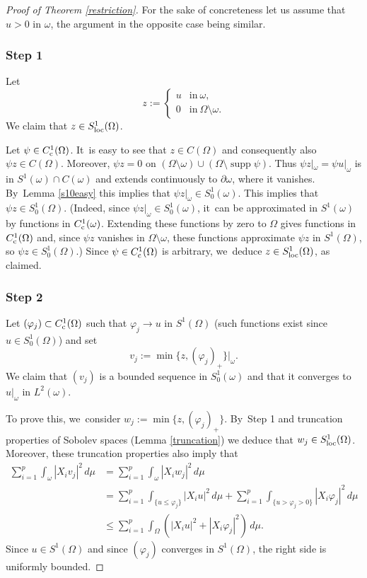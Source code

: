 \documentclass[10pt]{amsart}
\newcommand{\rc}{\textup{c}}
\newcommand{\loc}{\textup{loc}}
\theoremstyle{definition}
\let\phi\varphi
\newcommand{\1}{\mathbbm{1}}
\DeclareMathOperator{\supp}{supp}
\begin{document}
\begin{proof}[Proof of Theorem \ref{restriction}]
For the sake of concreteness let us assume that $u> 0$ in $\omega$, the argument in the opposite case being similar.

\subsubsection*{Step 1} Let
\[
z:= \begin{cases} u & \text{in}\ \omega,\\ 0 & \text{in}\ \Omega\setminus\omega. \end{cases}
\]
We claim that $z\in S^1_\loc(\Omega)$.

Let $\psi\in C^1_\rc(\Omega)$. It~is easy to see that $z\in C(\Omega)$ and consequently also $\psi z\in C(\Omega)$. Moreover, $\psi z=0$ on $(\Omega\setminus\omega)\cup(\Omega\setminus\supp\psi)$. Thus $\psi z|_\omega = \psi u|_\omega$ is in $S^1(\omega)\cap C(\omega)$ and extends continuously to $\partial\omega$, where it vanishes. By~Lemma \ref{s10easy} this implies that $\psi z|_\omega \in S^1_0(\omega)$. This implies that $\psi z\in S^1_0(\Omega)$. (Indeed, since $\psi z|_\omega\in S^1_0(\omega)$, it~can be approximated in $S^1(\omega)$ by functions in $C^1_\rc(\omega)$. Extending these functions by zero to $\Omega$ gives functions in $C^1_\rc(\Omega)$ and, since $\psi z$ vanishes in $\Omega\setminus\omega$, these functions approximate $\psi z$ in $S^1(\Omega)$, so $\psi z\in S^1_0(\Omega)$.) Since $\psi\in C^1_\rc(\Omega)$ is arbitrary, we~deduce $z\in S^1_\loc(\Omega)$, as claimed.

\subsubsection*{Step 2} Let $(\phi_j)\subset C^1_\rc(\Omega)$ such that $\phi_j\to u$ in $S^1(\Omega)$ (such functions exist since $u\in S^1_0(\Omega)$) and set
\[
v_j := \min\{ z, (\phi_j)_+ \}|_\omega.
\]
We claim that $(v_j)$ is a bounded sequence in $S^1_0(\omega)$ and that it converges to $u|_\omega$ in $L^2(\omega)$.

To prove this, we~consider $w_j:=\min\{ z, (\phi_j)_+ \}$. By~Step 1 and truncation properties of Sobolev spaces (Lemma \ref{truncation}) we deduce that $w_j\in S^1_\loc(\Omega)$. Moreover, these truncation properties also imply that
\begin{align*}
\sum_{i=1}^p \int_\omega |X_i v_j|^2\,d\mu & = \sum_{i=1}^p \int_\omega |X_i w_j|^2\,d\mu \\
& = \sum_{i=1}^p \int_{\{u \leq \phi_j \}} |X_i u|^2\,d\mu + \sum_{i=1}^p \int_{\{ u> \phi_j >0 \}} |X_i \phi_j|^2\,d\mu \\
& \leq \sum_{i=1}^p \int_\Omega (|X_i u|^2 + |X_i \phi_j|^2)\,d\mu.
\end{align*}
Since $u\in S^1(\Omega)$ and since $(\phi_j)$ converges in $S^1(\Omega)$, the right side is uniformly bounded.


\end{proof}
\end{document}
